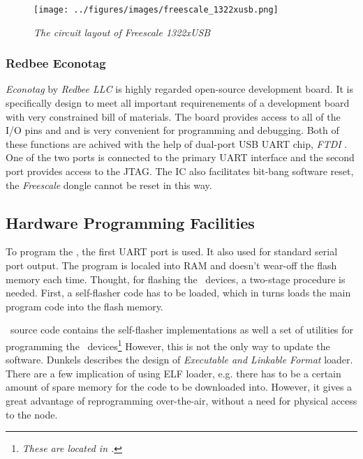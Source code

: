 \begin{figure}
\centering
\texttt{[image: ../figures/images/freescale\_1322xusb.png]}
\caption{\emph{The circuit layout of Freescale 1322xUSB}} \label{fig:freescale-usb}
\end{figure}

\subsubsection{Redbee Econotag}

 \emph{Econotag} by \emph{Redbee LLC} is highly regarded open-source
 development board. It is specifically design to meet all important
 requirenements of a development board with very constrained bill of
 materials. The board provides access to all of the I/O pins and
 and is very convenient for programming and debugging. Both of these
 functions are achived with the help of dual-port USB UART chip,
 \emph{FTDI}  \cite{datasheet:ftdi:dual}. One of the
 two ports is connected to the primary UART interface and the second
 port provides access to the JTAG. The  IC also facilitates
 bit-bang software reset, the \emph{Freescale} dongle cannot be reset
 in this way.

\subsection{Hardware Programming Facilities}

  To program the , the first UART port is used. It also
 used for standard serial port output. The program is localed into
 RAM and doesn't wear-off the flash memory each time. Thought, for
 flashing the \MCX\ devices, a two-stage procedure is needed. First,
 a self-flasher code has to be loaded, which in turns loads the
 main program code into the flash memory.
 
  \Contiki\ source code contains the self-flasher implementations as
 well a set of utilities for programming the \MCX\ devices\footnote{%
 \emph{These are located in .}} However, this
 is not the only way to update the software. Dunkels describes the design
 of \Contiki \emph{Executable and Linkable Format} \cite{dunkels06runtime}
 loader.  There are a few implication of using ELF loader, e.g. there
 has to be a certain amount of spare memory for the code to be downloaded
 into. However, it gives a great advantage of reprogramming over-the-air,
 without a need for physical access to the node.


